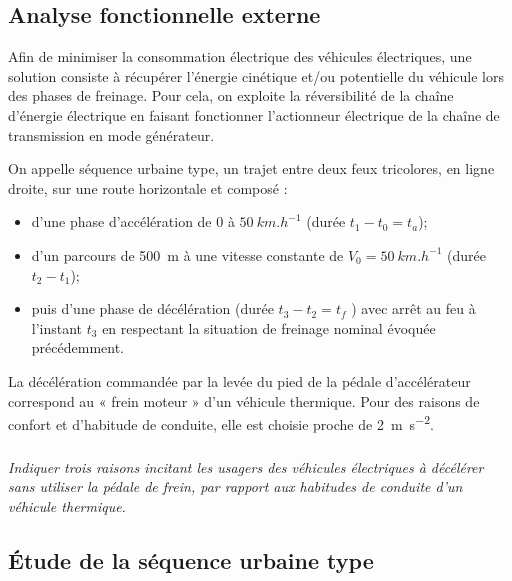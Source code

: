 \documentclass[10pt,fleqn]{article} %
\begin{document}
\begin{multicols}{2}
\section*{Analyse fonctionnelle externe}

Afin de minimiser la consommation électrique des véhicules électriques, une solution consiste à récupérer l’énergie
cinétique et/ou potentielle du véhicule lors des phases de freinage. Pour cela, on exploite la réversibilité de la
chaîne d’énergie électrique en faisant fonctionner l’actionneur électrique de la chaîne de transmission en mode
générateur.


On appelle séquence urbaine type, un trajet entre deux feux tricolores, en ligne droite, sur une route horizontale
et composé :
\begin{itemize}
\item d’une phase d’accélération de 0 à $\SI{50}{km.h^{-1}}$ (durée $t_1 - t_0 = t_a$);
\item d’un parcours de \SI{500}{m} à une vitesse constante de $V_0 =\SI{50}{km.h^{-1}}$ (durée $t_2- t_1$);
\item puis d’une phase de décélération (durée $t_3 -t_2 =t_f$ ) avec arrêt au feu à l’instant $t_3$ en respectant la situation
de freinage nominal évoquée précédemment.
\end{itemize}

La décélération commandée par la levée du pied de la pédale d’accélérateur correspond
au « frein moteur » d’un véhicule thermique. Pour des raisons de confort
et d’habitude de conduite, elle est choisie proche de \SI{2}{m.s^{-2}}. %


\subparagraph{}\textit{Indiquer trois raisons incitant les usagers des véhicules électriques à décélérer sans utiliser la pédale de frein, par rapport aux habitudes de conduite d’un véhicule thermique.}
\ifprof
\begin{corrige}
\end{corrige}
\else
\fi

\subsection*{Étude de la séquence urbaine type}


\end{multicols}
\end{document}
